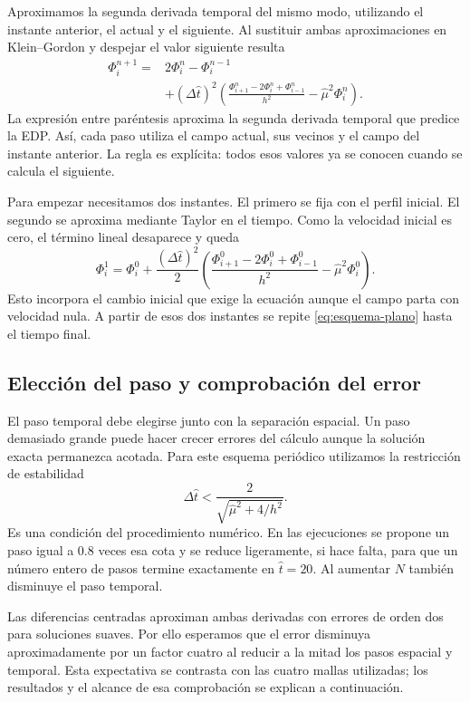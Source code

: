 Aproximamos la segunda derivada temporal del mismo modo, utilizando el
instante anterior, el actual y el siguiente. Al sustituir ambas
aproximaciones en Klein--Gordon y despejar el valor siguiente resulta
\begin{equation}
\begin{aligned}
\Phi_i^{n+1}={}&2\Phi_i^n-\Phi_i^{n-1}\\
&+(\Delta\widehat t)^2
\left(\frac{\Phi_{i+1}^n-2\Phi_i^n+\Phi_{i-1}^n}{h^2}
-\widehat\mu^2\Phi_i^n\right).
\end{aligned}
\label{eq:esquema-plano}
\end{equation}
La expresión entre paréntesis aproxima la segunda derivada temporal que
predice la EDP. Así, cada paso utiliza el campo actual, sus vecinos y el
campo del instante anterior. La regla es explícita: todos esos valores
ya se conocen cuando se calcula el siguiente.

Para empezar necesitamos dos instantes. El primero se fija con el perfil
inicial. El segundo se aproxima mediante Taylor en el tiempo. Como la
velocidad inicial es cero, el término lineal desaparece y queda
\begin{equation}
\Phi_i^1=\Phi_i^0+\frac{(\Delta\widehat t)^2}{2}
\left(\frac{\Phi_{i+1}^0-2\Phi_i^0+\Phi_{i-1}^0}{h^2}
-\widehat\mu^2\Phi_i^0\right).
\label{eq:inicio-plano}
\end{equation}
Esto incorpora el cambio inicial que exige la ecuación aunque el campo
parta con velocidad nula. A partir de esos dos instantes se repite
\eqref{eq:esquema-plano} hasta el tiempo final.

\subsection{Elección del paso y comprobación del error}
El paso temporal debe elegirse junto con la separación espacial. Un paso
demasiado grande puede hacer crecer errores del cálculo aunque la
solución exacta permanezca acotada. Para este esquema periódico utilizamos
la restricción de estabilidad
\begin{equation}
\Delta\widehat t<\frac{2}{\sqrt{\widehat\mu^2+4/h^2}}.
\label{eq:estabilidad-plana}
\end{equation}
Es una condición del procedimiento numérico. En las ejecuciones se propone
un paso igual a $0.8$ veces esa cota y se reduce ligeramente, si hace falta,
para que un número entero de pasos termine exactamente en
$\widehat t=20$. Al aumentar $N$ también disminuye el paso temporal.

Las diferencias centradas aproximan ambas derivadas con errores de orden
dos para soluciones suaves. Por ello esperamos que el error disminuya
aproximadamente por un factor cuatro al reducir a la mitad los pasos
espacial y temporal. Esta expectativa se contrasta con las cuatro mallas
utilizadas; los resultados y el alcance de esa comprobación se explican
a continuación.
